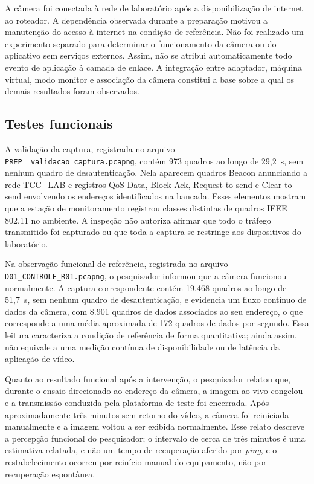 A câmera foi conectada à rede de laboratório após a disponibilização de internet ao roteador. A dependência observada durante a preparação motivou a manutenção do acesso à internet na condição de referência. Não foi realizado um experimento separado para determinar o funcionamento da câmera ou do aplicativo sem serviços externos. Assim, não se atribui automaticamente todo evento de aplicação à camada de enlace. A integração entre adaptador, máquina virtual, modo monitor e associação da câmera constitui a base sobre a qual os demais resultados foram observados.

\subsection{Testes funcionais}
\label{subsec:testes_funcionais}

A validação da captura, registrada no arquivo \texttt{PREP\_\_\-valida\-cao\_\-captura.\-pcapng}, contém 973 quadros ao longo de 29,2~s, sem nenhum quadro de desautenticação. Nela aparecem quadros Beacon anunciando a rede TCC\_LAB e registros QoS Data, Block Ack, Request-to-send e Clear-to-send envolvendo os endereços identificados na bancada. Esses elementos mostram que a estação de monitoramento registrou classes distintas de quadros IEEE 802.11 no ambiente. A inspeção não autoriza afirmar que todo o tráfego transmitido foi capturado ou que toda a captura se restringe aos dispositivos do laboratório.



Na observação funcional de referência, registrada no arquivo \texttt{D01\_CONTROLE\_R01.pcapng}, o pesquisador informou que a câmera funcionou normalmente. A captura correspondente contém 19.468 quadros ao longo de 51,7~s, sem nenhum quadro de desautenticação, e evidencia um fluxo contínuo de dados da câmera, com 8.901 quadros de dados associados ao seu endereço, o que corresponde a uma média aproximada de 172 quadros de dados por segundo. Essa leitura caracteriza a condição de referência de forma quantitativa; ainda assim, não equivale a uma medição contínua de disponibilidade ou de latência da aplicação de vídeo.



Quanto ao resultado funcional após a intervenção, o pesquisador relatou que, durante o ensaio direcionado ao endereço da câmera, a imagem ao vivo congelou e a transmissão conduzida pela plataforma de teste foi encerrada. Após aproximadamente três minutos sem retorno do vídeo, a câmera foi reiniciada manualmente e a imagem voltou a ser exibida normalmente. Esse relato descreve a percepção funcional do pesquisador; o intervalo de cerca de três minutos é uma estimativa relatada, e não um tempo de recuperação aferido por \textit{ping}, e o restabelecimento ocorreu por reinício manual do equipamento, não por recuperação espontânea.

